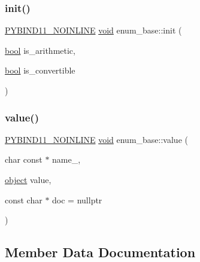 \subsubsection{\texorpdfstring{init()}{init()}}
{\footnotesize\ttfamily \mbox{\hyperlink{detail_2common_8h_a1fb186b7494d5c576d902c0730ecbb71}{P\+Y\+B\+I\+N\+D11\+\_\+\+N\+O\+I\+N\+L\+I\+NE}} \mbox{\hyperlink{_s_d_l__opengles2__gl2ext_8h_ae5d8fa23ad07c48bb609509eae494c95}{void}} enum\+\_\+base\+::init (\begin{DoxyParamCaption}\item[{\mbox{\hyperlink{asdl_8h_af6a258d8f3ee5206d682d799316314b1}{bool}}}]{is\+\_\+arithmetic,  }\item[{\mbox{\hyperlink{asdl_8h_af6a258d8f3ee5206d682d799316314b1}{bool}}}]{is\+\_\+convertible }\end{DoxyParamCaption})\hspace{0.3cm}{\ttfamily [inline]}}

\mbox{\label{structenum__base_a93a70f7b4e3397302a97d42f7d941793}} 
\subsubsection{\texorpdfstring{value()}{value()}}
{\footnotesize\ttfamily \mbox{\hyperlink{detail_2common_8h_a1fb186b7494d5c576d902c0730ecbb71}{P\+Y\+B\+I\+N\+D11\+\_\+\+N\+O\+I\+N\+L\+I\+NE}} \mbox{\hyperlink{_s_d_l__opengles2__gl2ext_8h_ae5d8fa23ad07c48bb609509eae494c95}{void}} enum\+\_\+base\+::value (\begin{DoxyParamCaption}\item[{char const $\ast$}]{name\+\_\+,  }\item[{\mbox{\hyperlink{classobject}{object}}}]{value,  }\item[{const char $\ast$}]{doc = {\ttfamily nullptr} }\end{DoxyParamCaption})\hspace{0.3cm}{\ttfamily [inline]}}



\subsection{Member Data Documentation}
\mbox{\label{structenum__base_a11a00d03ae8a8f8e302a63f9cee5e5c3}} 
